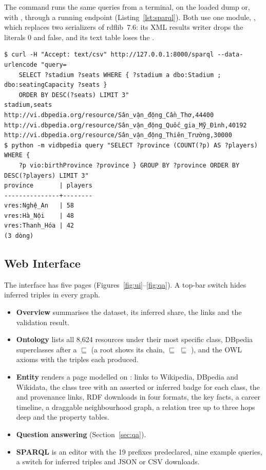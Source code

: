 The command  runs the same queries from a
terminal, on the loaded dump or, with , through a running
endpoint (Listing~\ref{lst:sparql}). Both use one module, ,
which replaces two serializers of rdflib~7.6: its XML results writer drops the
literals 0 and false, and its text table loses the .

\begin{listing}[t]
\begin{Verbatim}
$ curl -H "Accept: text/csv" http://127.0.0.1:8000/sparql --data-urlencode "query=
    SELECT ?stadium ?seats WHERE { ?stadium a dbo:Stadium ; dbo:seatingCapacity ?seats }
    ORDER BY DESC(?seats) LIMIT 3"
stadium,seats
http://vi.dbpedia.org/resource/Sân_vận_động_Cần_Thơ,44400
http://vi.dbpedia.org/resource/Sân_vận_động_Quốc_gia_Mỹ_Đình,40192
http://vi.dbpedia.org/resource/Sân_vận_động_Thiên_Trường,30000
$ python -m vidbpedia query "SELECT ?province (COUNT(?p) AS ?players) WHERE {
    ?p vio:birthProvince ?province } GROUP BY ?province ORDER BY DESC(?players) LIMIT 3"
province       | players
---------------+--------
vres:Nghệ_An   | 58
vres:Hà_Nội    | 48
vres:Thanh_Hóa | 42
(3 dòng)
\end{Verbatim}
\caption{The SPARQL endpoint called with  (CSV results) and the
terminal client (table). The first query uses only DBpedia terms, so every
answer comes from inferred triples.}
\label{lst:sparql}
\end{listing}

\subsection{Web Interface}
\label{sec:ui}

The interface has five pages (Figures~\ref{fig:ui}--\ref{fig:qa}). A top-bar switch hides
inferred triples in every graph.
\begin{itemize}
  \item \textbf{Overview} summarises the dataset, its inferred share, the
        links and the validation result.
  \item \textbf{Ontology} lists all 8{,}624 resources under their most specific
         class, DBpedia superclasses after a $\sqsubseteq$ (a root shows
        its chain,  $\sqsubseteq$  $\sqsubseteq$
        ), and the OWL axioms with the triples each produced.
  \item \textbf{Entity} renders a page modelled on :
        links to Wikipedia, DBpedia and Wikidata, the class tree with an
        asserted or inferred badge for each class, the  and
        provenance links, RDF downloads in four formats, the key facts, a career
        timeline, a draggable neighbourhood graph, a relation tree up to three
        hops deep and the property tables.
  \item \textbf{Question answering} (Section~\ref{sec:qa}).
  \item \textbf{SPARQL} is an editor with the 19 prefixes predeclared, nine
        example queries, a switch for inferred triples and JSON or CSV downloads.
\end{itemize}

